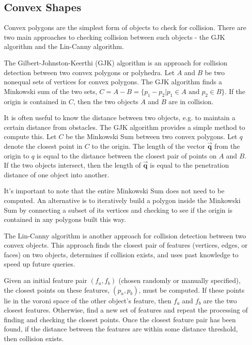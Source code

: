 \documentclass[10pt,conference]{ieeeconf}
\begin{document}
\subsection{Convex Shapes}
	
	Convex polygons are the simplest form of objects to check for collision. There are two main approaches to checking collision between such objects - the GJK algorithm and the Lin-Canny algorithm.
	
	The Gilbert-Johnston-Keerthi (GJK) algorithm \cite{gilbert1988fast} is an approach for collision detection between two convex polygons or polyhedra. Let $A$ and $B$ be two nonequal sets of vertices for convex polygons. The GJK algorithm finds a Minkowski sum of the two sets, $C = A - B = \{p_1 - p_2 | p_1 \in A \text{ and } p_2 \in B\}$. If the origin is contained in $C$, then the two objects $A$ and $B$ are in collision.
	
	It is often useful to know the distance between two objects, e.g. to maintain a certain distance from obstacles. The GJK algorithm provides a simple method to compute this. Let $C$ be the Minkowski Sum between two convex polygons. Let $q$ denote the closest point in $C$ to the origin. The length of the vector $\vec{\textbf{q}}$ from the origin to $q$ is equal to the distance between the closest pair of points on $A$ and $B$. If the two objects intersect, then the length of $\vec{\textbf{q}}$ is equal to the penetration distance of one object into another.
	
	It's important to note that the entire Minkowski Sum does not need to be computed. An alternative is to iteratively build a polygon inside the Minkowski Sum by connecting a subset of its vertices and checking to see if the origin is contained in any polygons built this way. 
	
	The Lin-Canny algorithm \cite{lin1991fast} is another approach for collision detection between two convex objects. This approach finds the closest pair of features (vertices, edges, or faces) on two objects, determines if collision exists, and uses past knowledge to speed up future queries. 
	
	Given an initial feature pair $(f_a, f_b)$ (chosen randomly or manually specified), the closest points on these features, $(p_a, p_b)$, must be computed. If these points lie in the voroni space of the other object's feature, then $f_a$ and $f_b$ are the two closest features. Otherwise, find a new set of features and repeat the processing of finding and checking the closest points. Once the closest feature pair has been found, if the distance between the features are within some distance threshold, then collision exists.
	
\end{document}
